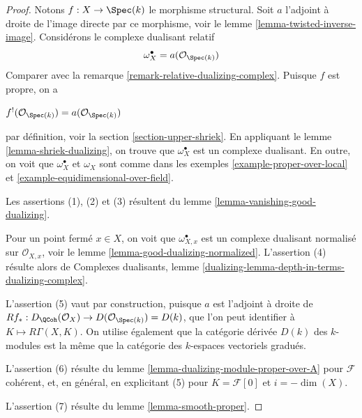 \begin{proof}
Notons $f : X \to \Spec(k)$ le morphisme structural. Soit $a$ l'adjoint à droite de l'image directe par ce morphisme, voir le lemme \ref{lemma-twisted-inverse-image}. Considérons le complexe dualisant relatif
$$
\omega_X^\bullet = a(\mathcal{O}_{\Spec(k)})
$$
Comparer avec la remarque \ref{remark-relative-dualizing-complex}. Puisque $f$ est propre, on a
\par\noindent\hfil
$f^!(\mathcal{O}_{\Spec(k)}) = a(\mathcal{O}_{\Spec(k)})$
\hfil\par\noindent
par définition, voir la section \ref{section-upper-shriek}. En appliquant le lemme \ref{lemma-shriek-dualizing}, on trouve que $\omega_X^\bullet$ est un complexe dualisant. En outre, on voit que $\omega_X^\bullet$ et $\omega_X$ sont comme dans les exemples \ref{example-proper-over-local} et \ref{example-equidimensional-over-field}.

\medskip\noindent
Les assertions (1), (2) et (3) résultent du lemme \ref{lemma-vanishing-good-dualizing}.

\medskip\noindent
Pour un point fermé $x \in X$, on voit que $\omega_{X, x}^\bullet$ est un complexe dualisant normalisé sur $\mathcal{O}_{X, x}$, voir le lemme \ref{lemma-good-dualizing-normalized}. L'assertion (4) résulte alors de Complexes dualisants, lemme \ref{dualizing-lemma-depth-in-terms-dualizing-complex}.

\medskip\noindent
L'assertion (5) vaut par construction, puisque $a$ est l'adjoint à droite de $Rf_* : D_\QCoh(\mathcal{O}_X) \to D(\mathcal{O}_{\Spec(k)}) = D(k)$, que l'on peut identifier à $K \mapsto R\Gamma(X, K)$. On utilise également que la catégorie dérivée $D(k)$ des $k$-modules est la même que la catégorie des $k$-espaces vectoriels gradués.

\medskip\noindent
L'assertion (6) résulte du lemme \ref{lemma-dualizing-module-proper-over-A} pour $\mathcal{F}$ cohérent, et, en général, en explicitant (5) pour $K = \mathcal{F}[0]$ et $i = -\dim(X)$.

\medskip\noindent
L'assertion (7) résulte du lemme \ref{lemma-smooth-proper}.
\end{proof}

